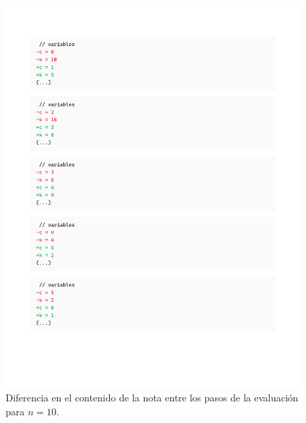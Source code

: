 \begin{figure}[h]
    \centering
    \includegraphics[width=1.0\textwidth]{figures/clltz_logs_10.pdf}
    \caption{Diferencia en el contenido de la nota entre los pasos de la evaluación para $n=10$.}
    \label{fig:collatz_diff}
\end{figure}

